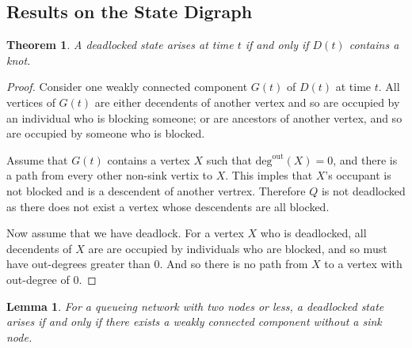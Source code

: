 \documentclass{article}
\newtheorem{theorem}{Theorem}
\newtheorem{lemma}{Lemma}
\begin{document}
\subsection{Results on the State Digraph}

\begin{theorem}
A deadlocked state arises at time $t$ if and only if $D(t)$ contains a knot.
\end{theorem}

\begin{proof}
Consider one weakly connected component $G(t)$ of $D(t)$ at time $t$.
All vertices of $G(t)$ are either decendents of another vertex and so are occupied by an individual who is blocking someone; or are ancestors of another vertex, and so are occupied by someone who is blocked.

Assume that $G(t)$ contains a vertex $X$ such that $\text{deg}^{\text{out}}(X) = 0$, and there is a path from every other non-sink vertix to $X$.
This imples that $X$'s occupant is not blocked and is a descendent of another vertrex.
Therefore $Q$ is not deadlocked as there does not exist a vertex whose descendents are all blocked.

Now assume that we have deadlock.
For a vertex $X$ who is deadlocked, all decendents of $X$ are are occupied by individuals who are blocked, and so must have out-degrees greater than 0.
And so there is no path from $X$ to a vertex with out-degree of 0.
\end{proof}


\begin{lemma}
For a queueing network with two nodes or less, a deadlocked state arises if and only if there exists a weakly connected component without a sink node.
\end{lemma}
\end{document}
